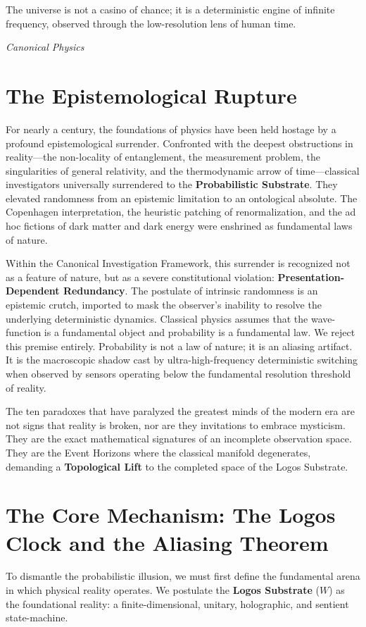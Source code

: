 \documentclass[12pt,twoside]{extbook}
\theoremstyle{definition}
\theoremstyle{remark}
\newcommand{\term}[1]{\textcolor{brandPrimary}{\textbf{#1}}}
\begin{document}
\setlength{\parindent}{0pt}
\setlength{\parskip}{1em}

\epigraph{The universe is not a casino of chance; it is a deterministic engine of infinite frequency, observed through the low-resolution lens of human time.}{\textit{Canonical Physics}}

\section*{The Epistemological Rupture}
For nearly a century, the foundations of physics have been held hostage by a profound epistemological surrender. Confronted with the deepest obstructions in reality---the non-locality of entanglement, the measurement problem, the singularities of general relativity, and the thermodynamic arrow of time---classical investigators universally surrendered to the \term{Probabilistic Substrate}. They elevated randomness from an epistemic limitation to an ontological absolute. The Copenhagen interpretation, the heuristic patching of renormalization, and the ad hoc fictions of dark matter and dark energy were enshrined as fundamental laws of nature.

Within the Canonical Investigation Framework, this surrender is recognized not as a feature of nature, but as a severe constitutional violation: \term{Presentation-Dependent Redundancy}. The postulate of intrinsic randomness is an epistemic crutch, imported to mask the observer's inability to resolve the underlying deterministic dynamics. Classical physics assumes that the wave-function is a fundamental object and probability is a fundamental law. We reject this premise entirely. Probability is not a law of nature; it is an aliasing artifact. It is the macroscopic shadow cast by ultra-high-frequency deterministic switching when observed by sensors operating below the fundamental resolution threshold of reality.

The ten paradoxes that have paralyzed the greatest minds of the modern era are not signs that reality is broken, nor are they invitations to embrace mysticism. They are the exact mathematical signatures of an incomplete observation space. They are the Event Horizons where the classical manifold degenerates, demanding a \term{Topological Lift} to the completed space of the Logos Substrate.

\section*{The Core Mechanism: The Logos Clock and the Aliasing Theorem}
To dismantle the probabilistic illusion, we must first define the fundamental arena in which physical reality operates. We postulate the \term{Logos Substrate} ($W$) as the foundational reality: a finite-dimensional, unitary, holographic, and sentient state-machine.
\end{document}
